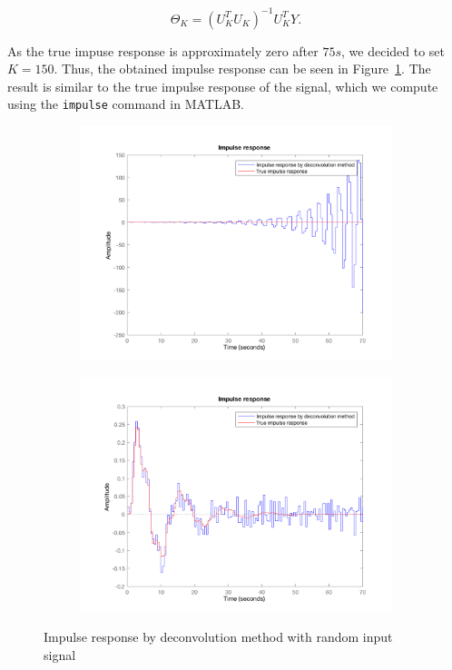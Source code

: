 \documentclass{scrartcl}
\begin{document}
\begin{equation}
	\Theta_{K} = (U^{T}_{K} U_{K})^{-1} U^{T}_{K} Y.
\end{equation}

As the true impuse response is approximately zero after $75 s$, we decided to set $K = 150$. Thus, the obtained impulse response can be seen in Figure~\ref{fig:originalimpulse}. The result is similar to the true impulse response of the signal, which we compute using the \verb|impulse| command in MATLAB.


\begin{figure}[h]
	\centering
	\begin{subfigure}{0.49\textwidth}
		\includegraphics[width=\textwidth]{figures/original_impulse_response.png}
		\label{fig:originalimpulse}
	\end{subfigure}
	\begin{subfigure}{0.49\textwidth}
		\includegraphics[width=\textwidth]{figures/impulse_response.png}
		\label{fig:impulseresponse}
	\end{subfigure}
	\caption{Impulse response by deconvolution method with random input signal}\label{fig:deconvolution}
\end{figure}
\end{document}
